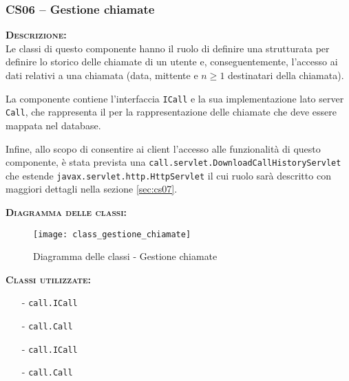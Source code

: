 
\subsubsection{CS06 -- Gestione chiamate}\label{sec:cs06}
\begin{description}
  \item{\scshape\bfseries Descrizione:}\\
Le classi di questo componente hanno il ruolo di definire una strutturata per definire lo storico delle chiamate di un utente e, conseguentemente, l'accesso ai dati relativi a una chiamata (data, mittente e $n\geq1$ destinatari della chiamata).

La componente contiene l'interfaccia \texttt{ICall} e la sua implementazione lato server \texttt{Call}, che rappresenta il  per la rappresentazione delle chiamate che deve essere mappata nel database.

Infine, allo scopo di consentire ai client l'accesso alle funzionalità di questo componente, è stata prevista una  \texttt{call.servlet.DownloadCallHistoryServlet} che estende \texttt{javax.servlet.http.HttpServlet} il cui ruolo sarà descritto con maggiori dettagli nella sezione \vref{sec:cs07}.

  \item{\scshape\bfseries Diagramma delle classi:}
\begin{figure}[H]
  \centering
  \texttt{[image: class\_gestione\_chiamate]}
  \caption{Diagramma delle classi - Gestione chiamate}\label{fig:gestionechiamate}
\end{figure}

  \item{\scshape\bfseries Classi utilizzate:}\\
  \begin{itemize}[noitemsep,nolistsep]
    \item[-] \texttt{call.ICall}
    \item[-] \texttt{call.Call}
     \item[-] \texttt{call.ICall}
    \item[-] \texttt{call.Call}
  \end{itemize}
\end{description}


